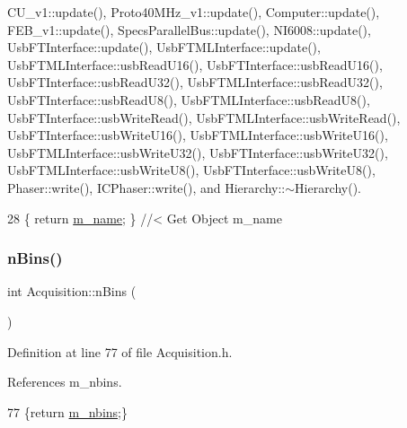 C\+U\+\_\+v1\+::update(), Proto40\+M\+Hz\+\_\+v1\+::update(), Computer\+::update(), F\+E\+B\+\_\+v1\+::update(), Specs\+Parallel\+Bus\+::update(), N\+I6008\+::update(), Usb\+F\+T\+Interface\+::update(), Usb\+F\+T\+M\+L\+Interface\+::update(), Usb\+F\+T\+M\+L\+Interface\+::usb\+Read\+U16(), Usb\+F\+T\+Interface\+::usb\+Read\+U16(), Usb\+F\+T\+Interface\+::usb\+Read\+U32(), Usb\+F\+T\+M\+L\+Interface\+::usb\+Read\+U32(), Usb\+F\+T\+Interface\+::usb\+Read\+U8(), Usb\+F\+T\+M\+L\+Interface\+::usb\+Read\+U8(), Usb\+F\+T\+Interface\+::usb\+Write\+Read(), Usb\+F\+T\+M\+L\+Interface\+::usb\+Write\+Read(), Usb\+F\+T\+Interface\+::usb\+Write\+U16(), Usb\+F\+T\+M\+L\+Interface\+::usb\+Write\+U16(), Usb\+F\+T\+M\+L\+Interface\+::usb\+Write\+U32(), Usb\+F\+T\+Interface\+::usb\+Write\+U32(), Usb\+F\+T\+M\+L\+Interface\+::usb\+Write\+U8(), Usb\+F\+T\+Interface\+::usb\+Write\+U8(), Phaser\+::write(), I\+C\+Phaser\+::write(), and Hierarchy\+::$\sim$\+Hierarchy().


\begin{DoxyCode}
28 \{ \textcolor{keywordflow}{return} \hyperlink{classObject_a8b83c95c705d2c3ba0d081fe1710f48d}{m\_name}; \} \textcolor{comment}{//< Get Object m\_name}
\end{DoxyCode}
\mbox{\label{classAcquisition_a3a3dad0de9535d5a29c0810a5bdc3ae3}} 
\subsubsection{\texorpdfstring{n\+Bins()}{nBins()}\hspace{0.1cm}{\footnotesize\ttfamily [1/2]}}
{\footnotesize\ttfamily int Acquisition\+::n\+Bins (\begin{DoxyParamCaption}{ }\end{DoxyParamCaption})\hspace{0.3cm}{\ttfamily [inline]}}



Definition at line 77 of file Acquisition.\+h.



References m\+\_\+nbins.


\begin{DoxyCode}
77 \{\textcolor{keywordflow}{return} \hyperlink{classAcquisition_a05bccdc4b9ada37beaeba8794ccef12d}{m\_nbins};\}
\end{DoxyCode}
\mbox{\label{classAcquisition_a3a3dad0de9535d5a29c0810a5bdc3ae3}} 
